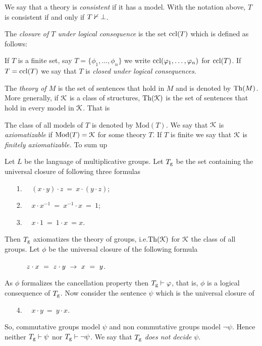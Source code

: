 We say that a theory is \emph{consistent\/} if it has a model.
With the notation above, $T$ is consistent if and only if \emph{$T\nvdash\bot$.}


The \emph{closure of $T$ under logical consequence\/} is the set ${\rm ccl}(T)$ which is defined as follows:  


If $T$ is a finite set, say $T=\big\{\phi_1,\dots,\phi_n\big\}$ we write ${\rm ccl}(\varphi_1,\dots,\varphi_n)$ for ${\rm ccl}(T)$.
If $T={\rm ccl}(T)$ we say that $T$ is \emph{closed under logical consequences.}

The \emph{theory of $M$\/} is the set of sentences that hold in $M$ and is denoted by \emph{${\rm Th}(M)$.}
More generally, if $\EuScript K$ is a class of structures, \emph{${\rm Th}(\EuScript K)$} is the set of sentences that hold in every model in $\EuScript K$.
That is


The class of all models of $T$ is denoted by \emph{$\textrm{Mod}(T)$.}
We say that $\EuScript K$ is \emph{axiomatizable\/} if $\mathop{\rm Mod}(T)=\EuScript K$ for some theory $T$.
If $T$ is finite we say that $\EuScript K$ is \emph{finitely axiomatizable.}
To sum up





\begin{example}\label{Tg}
Let $L$ be the language of multiplicative groups.
Let $T_{\rm g}$ be the set containing the universal closure of following three formulas
\begin{itemize}
\item[1.]\ \  $(x\cdot y)\cdot z\ =\ x\cdot(y\cdot z)$;
\item[2.]\ \  $ x\cdot x^{-1}\ =\ x^{-1}\cdot x\ =\ 1$;
\item[3.]\ \  $x\cdot 1\ =\ 1\cdot x\ =x$.
\end{itemize}
Then $T_{\rm g}$ axiomatizes the theory of groups, i.e.\@ ${\rm Th}(\EuScript K)$ for $\EuScript K$ the class of all groups.
Let $\phi$ be the universal closure of the following formula
\begin{itemize}
\item[]\ \  $\ z\cdot x\ =\  z\cdot y\ \imp\ x\ =\ y$.
\end{itemize}
As $\phi$ formalizes the cancellation property then $T_{\rm g} \vdash\varphi$, that is, $\phi$ is a logical consequence of $T_{\rm g}$.
Now consider the sentence $\psi$ which is the universal closure of
\begin{itemize}
\item[4.]\ \  $x\cdot y\ =\ y\cdot x$.
\end{itemize}
So, commutative groups model $\psi$ and non commutative groups model $\neg\psi$.
Hence neither $T_{\rm g}\vdash\psi$ nor $T_{\rm g}\vdash\neg\psi$.
We say that $T_{\rm g}$ \emph{does not decide\/} $\psi$.
\end{example}

